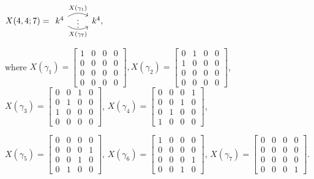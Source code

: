 \documentclass[a4paper,12pt]{amsart}
\newenvironment{example}[1][Example.]{\begin{trivlist}
\item[\hskip \labelsep {\bfseries #1}]}{\end{trivlist}}
\begin{document}
\begin{example}
\begin{center}
 $X(4,4;7)=\begin{tikzcd}
   k^4 
    \arrow[r, draw=none, "{\vdots}" description]
    \arrow[r, bend left,        "X(\gamma_1)"]
    \arrow[r, bend right, swap, "X(\gamma_7)"]
    &
     k^4,
\end{tikzcd}$
\end{center}
where $X(\gamma_1)=\begin{bmatrix}
1 & 0 & 0 &0\\
0 & 0 & 0 & 0\\
0 & 0 & 0 &0 \\
0 & 0 & 0 &0 
\end{bmatrix}, X(\gamma_2)=\begin{bmatrix}
0 & 1& 0 & 0\\
1 & 0 & 0 & 0\\
0 & 0 & 0 & 0 \\
0 & 0 & 0 & 0
\end{bmatrix}$, $X(\gamma_3)= \begin{bmatrix}
0 & 0& 1 & 0\\
0 & 1& 0 & 0\\
1& 0 & 0 & 0 \\
0 & 0 & 0 & 0
\end{bmatrix}$, $X(\gamma_4)= \begin{bmatrix}
0 & 0& 0 & 1  \\
0 & 0& 1 & 0 \\
0& 1 & 0 & 0\\
1 & 0 & 0 & 0
\end{bmatrix}$, 


$X(\gamma_5)= \begin{bmatrix}
0 & 0& 0 & 0\\
0 & 0& 0  & 1 \\
0& 0 & 1 & 0 \\
0 & 1 & 0 & 0
\end{bmatrix}$,  $ X(\gamma_6)= \begin{bmatrix}
1 & 0 & 0 &0\\
0 & 0 & 0 & 0\\
0 & 0 & 0 &1 \\
0 & 0 & 1 &0 
\end{bmatrix}$, $ X(\gamma_7)= \begin{bmatrix}
0 & 0 & 0 &0\\
0 & 0 & 0 & 0\\
0 & 0 & 0 &0 \\
0 & 0 & 0 & 1 
\end{bmatrix}$.

\end{example}
\end{document}

